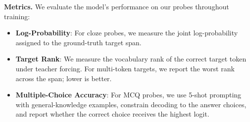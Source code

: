 \textbf{Metrics.} We evaluate the model's performance on our probes throughout training:
\begin{itemize}
[itemsep=1pt, topsep=0pt]
    \item \textbf{Log-Probability}: For cloze probes, we measure the joint log-probability assigned to the ground-truth target span.
    \item \textbf{Target Rank}: We measure the vocabulary rank of the correct target token under teacher forcing. For multi-token targets, we report the worst rank across the span; lower is better.
    \item \textbf{Multiple-Choice Accuracy}: For MCQ probes, we use 5-shot prompting with general-knowledge examples, constrain decoding to the answer choices, and report whether the correct choice receives the highest logit.
\end{itemize}
